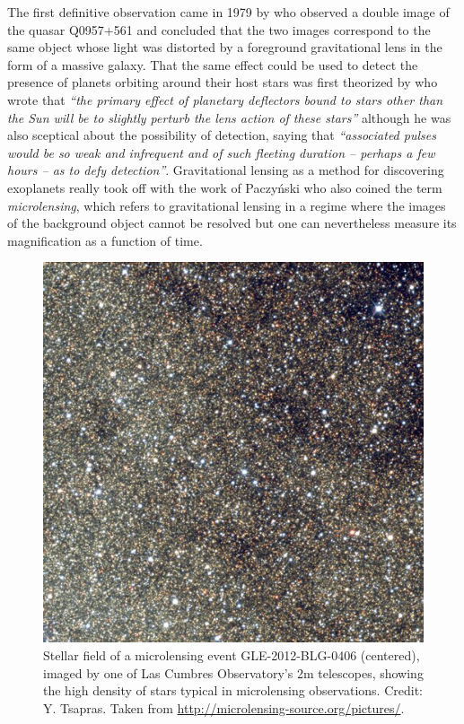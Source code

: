 \documentclass[11pt]{report}
\begin{document}
The first definitive observation came in 1979 by \citet{1980ApJ...241..507Y}
who observed a double image of the quasar Q0957+561 and concluded that the two
images correspond to the same object whose light was distorted by a foreground
gravitational lens in the form of a massive galaxy. That the same effect could
be used to detect the presence of planets orbiting around their host stars was
first theorized by \citet{1964PhRv..133..835L} who wrote that \emph{``the
    primary effect of planetary deflectors bound to stars other than the Sun will
    be to slightly perturb the lens action of these stars''} although he was also
sceptical about the possibility of detection, saying that \emph{``associated
    pulses would be so weak and infrequent and of such fleeting duration – perhaps
    a few hours – as to defy detection''}. Gravitational lensing as a method for
discovering exoplanets really took off with the work of Paczyński
\citep{1986ApJ...304....1P,1986ApJ...301..503P,1991ApJ...374L..37M} who also
coined the term \emph{microlensing}, which refers to gravitational lensing in a
regime where the images of the background object cannot be resolved but one can
nevertheless measure its magnification as a function of time.

\begin{figure}
    \begin{centering}
        \includegraphics[width=0.5\linewidth]{static/microlensing/crowded_field.jpg}
        \caption{
            Stellar field of a microlensing event GLE-2012-BLG-0406 (centered),
            imaged by one of Las Cumbres Observatory's 2m telescopes,
            showing the high density of stars typical in microlensing observations.
            Credit: Y. Tsapras. Taken from
            \url{http://microlensing-source.org/pictures/}.}
        \label{fig:crowded_field}
    \end{centering}
\end{figure}
\end{document}
